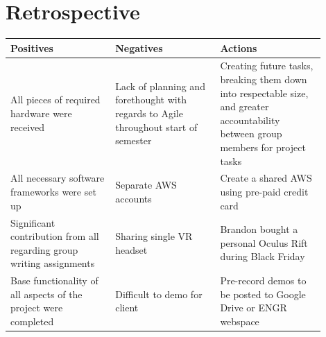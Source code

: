 \documentclass[onecolumn, draftclsnofoot,10pt, compsoc]{IEEEtran}
\begin{document}
\section{Retrospective}
    \begin{tabular}{| p{0.3\linewidth} | p{0.3\linewidth} | p{0.3\linewidth} |}
        \hline 
        Positives & Negatives & Actions \\ \hline
        
        All pieces of required hardware were received & Lack of planning and forethought with regards to Agile throughout start of semester & Creating future tasks, breaking them down into respectable size, and greater accountability between group members for project tasks \\ \hline
        
        All necessary software frameworks were set up & Separate AWS accounts & Create a shared AWS using pre-paid credit card \\ \hline
        
        Significant contribution from all regarding group writing assignments & Sharing single VR headset & Brandon bought a personal Oculus Rift during Black Friday \\ \hline
        
        Base functionality of all aspects of the project were completed & Difficult to demo for client & Pre-record demos to be posted to Google Drive or ENGR webspace \\ \hline

        
    \end{tabular}
\end{document}
